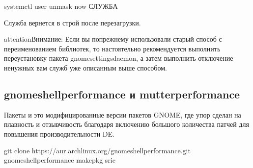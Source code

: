 \documentclass[letterpaper,10pt,russian,openany]{sphinxmanual}
\begin{document}
\begin{sphinxVerbatim}[commandchars=\\\{\}]
systemctl \PYGZhy{}\PYGZhy{}user unmask \PYGZhy{}\PYGZhy{}now СЛУЖБА
\end{sphinxVerbatim}

\sphinxAtStartPar
Служба вернется в строй после перезагрузки.

\begin{sphinxadmonition}{attention}{Внимание:}
\sphinxAtStartPar
Если вы по\sphinxhyphen{}прежнему использовали старый способ с переименованием библиотек,
то настоятельно рекомендуется выполнить переустановку пакета gnome\sphinxhyphen{}settings\sphinxhyphen{}daemon, а
затем выполнить отключение ненужных вам служб уже описанным выше способом.
\end{sphinxadmonition}

\ignorespaces 

\subsection{gnome\sphinxhyphen{}shell\sphinxhyphen{}performance и mutter\sphinxhyphen{}performance}
\label{\detokenize{source/de-optimizations:gnome-shell-performance-mutter-performance}}\label{\detokenize{source/de-optimizations:gnome-shell-and-mutter-performance}}\label{\detokenize{source/de-optimizations:index-5}}
\sphinxAtStartPar
Пакеты 
и  \sphinxhyphen{}
это модифицированные версии пакетов GNOME, где упор сделан на плавность и отзывчивость благодаря включению большого количества патчей для повышения производительности DE.

\sphinxAtStartPar
{}

\begin{sphinxVerbatim}[commandchars=\\\{\}]
git clone https://aur.archlinux.org/gnome\PYGZhy{}shell\PYGZhy{}performance.git 
 gnome\PYGZhy{}shell\PYGZhy{}performance                                      
makepkg \PYGZhy{}sric                                                   
\end{sphinxVerbatim}
\end{document}
